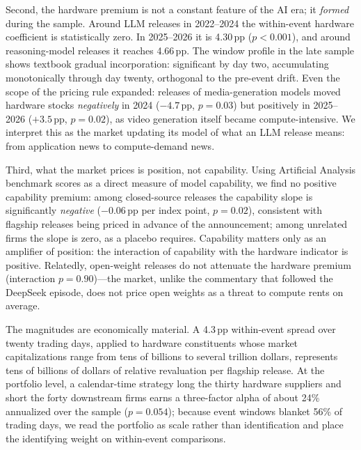 \documentclass[review,12pt,authoryear]{elsarticle}
\newcommand{\pp}{\,pp}
\begin{document}
Second, the hardware premium is not a constant feature of the AI era; it
\emph{formed} during the sample. Around LLM releases in 2022--2024 the
within-event hardware coefficient is statistically zero. In 2025--2026 it is
4.30\pp{} ($p<0.001$), and around reasoning-model releases it reaches
4.66\pp{}. The window profile in the late sample shows textbook gradual
incorporation: significant by day two, accumulating monotonically through day
twenty, orthogonal to the pre-event drift. Even the scope of the pricing rule
expanded: releases of media-generation models moved hardware stocks
\emph{negatively} in 2024 ($-4.7$\pp{}, $p=0.03$) but positively in 2025--2026
($+3.5$\pp{}, $p=0.02$), as video generation itself became compute-intensive.
We interpret this as the market updating its model of what an LLM release
means: from application news to compute-demand news.

Third, what the market prices is position, not capability. Using Artificial
Analysis benchmark scores as a direct measure of model capability, we find no
positive capability premium: among closed-source releases the capability slope
is significantly \emph{negative} ($-0.06$\pp{} per index point, $p=0.02$),
consistent with flagship releases being priced in advance of the announcement;
among unrelated firms the slope is zero, as a placebo requires. Capability
matters only as an amplifier of position: the interaction of capability with
the hardware indicator is positive. Relatedly, open-weight releases do not
attenuate the hardware premium (interaction $p=0.90$)---the market, unlike the
commentary that followed the DeepSeek episode, does not price open weights as a
threat to compute rents on average.

The magnitudes are economically material. A 4.3\pp{} within-event spread over
twenty trading days, applied to hardware constituents whose market
capitalizations range from tens of billions to several trillion dollars,
represents tens of billions of dollars of relative revaluation per flagship
release. At the portfolio level, a calendar-time strategy long the thirty
hardware suppliers and short the forty downstream firms earns a three-factor
alpha of about 24\% annualized over the sample ($p=0.054$); because event
windows blanket 56\% of trading days, we read the portfolio as scale rather
than identification and place the identifying weight on within-event
comparisons.
\end{document}
